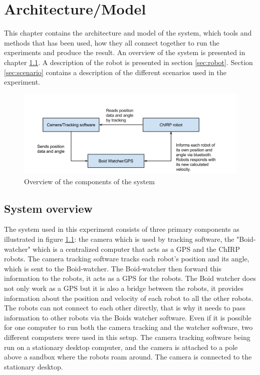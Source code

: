 \chapter{Architecture/Model}
\label{cha:architectureAndModel}
This chapter contains the architecture and model of the system, which tools and methods that has been used, how they all connect together to run the experiments and produce the result.
An overview of the system is presented in chapter \ref{sec:overview}. A description of the robot is presented in section \ref{sec:robot}. Section \ref{sec:scenario} contains a description of the different scenarios used in the experiment.

\begin{figure}[h]
\begin{center}
\includegraphics[width=\linewidth]{figs/system_overview}
\end{center}
\caption[System overview]{Overview of the components of the system}
\label{fig:overview}
\end{figure}

\section{System overview}
\label{sec:overview}
The system used in this experiment consists of three primary components as illustrated in figure \ref{fig:overview}: the camera which is used by tracking software, the "Boid-watcher" which is a centralized computer that acts as a GPS and the ChIRP robots.
The camera tracking software tracks each robot's position and its angle, which is sent to the Boid-watcher. The Boid-watcher then forward this information to the robots, it acts as a GPS for the robots. 
The Boid watcher does not only work as a GPS but it is also a bridge between the robots, it provides information about the position and velocity of each robot to all the other robots. The robots can not connect to each other directly, that is why it needs to pass information to other robots via the Boids watcher software.
Even if it is possible for one computer to run both the camera tracking and the watcher software, two different computers were used in this setup. The camera tracking software being run on a stationary desktop computer, and the camera is attached to a pole above a sandbox where the robots roam around. The camera is connected to the stationary desktop. 

